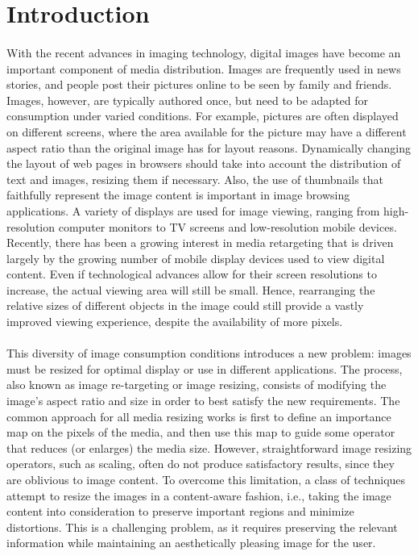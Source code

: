\documentclass[conference]{acmsiggraph}
\begin{document}
\TOGlinkslist


\copyrightspace

\section{Introduction}

\paragraph{}
With the recent advances in imaging technology, digital images have become an important component of media distribution. Images are frequently used in news stories, and people post their pictures online to be seen by family and friends. Images, however, are typically authored once, but need to be adapted for consumption under varied conditions. For example, pictures are often displayed on different screens, where the area available for the picture may have a different aspect ratio than the original image has for layout reasons. Dynamically changing the layout of web pages in browsers should take into account the distribution of text and images, resizing them if necessary. Also, the use of thumbnails that faithfully represent the image content is important in image browsing applications. A variety of displays are used for image viewing, ranging from high-resolution computer monitors to TV screens and low-resolution mobile devices. Recently, there has been a growing interest in media retargeting that is driven largely by the growing number of mobile display devices used to view digital content. Even if technological advances allow for their screen resolutions to increase, the actual viewing area will still be small. Hence, rearranging the relative sizes of different objects in the image could still provide a vastly improved viewing experience, despite the availability of more pixels.

\paragraph{}
This diversity of image consumption conditions introduces a new problem: images must be resized for optimal display or use in different applications. The process, also known as image re-targeting or image resizing, consists of modifying the image's aspect ratio and size in order to best satisfy the new requirements.  The common approach for all media resizing works is first to define an importance map on the pixels of the media, and then use this map to guide some operator that reduces (or enlarges) the media size. However, straightforward image resizing operators, such as scaling, often do not produce satisfactory results, since they are oblivious to image content. To overcome this limitation, a class of techniques attempt to resize the images in a content-aware fashion, i.e., taking the image content into consideration to preserve important regions and minimize distortions. This is a challenging problem, as it requires preserving the relevant information while maintaining an aesthetically pleasing image for the user.
\end{document}
